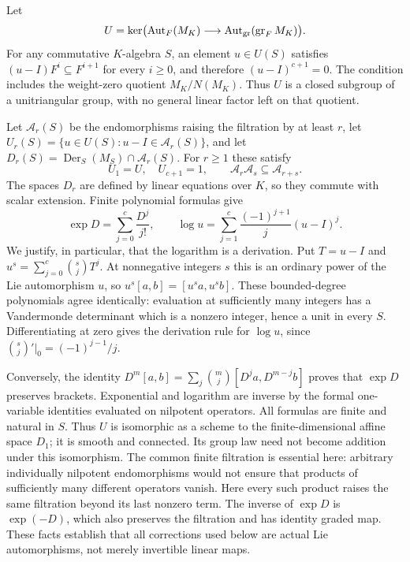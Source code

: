 Let
\[
 U=\ker\bigl(\operatorname{Aut}_F(M_K)
               \longrightarrow\operatorname{Aut}_{\operatorname{gr}}(\operatorname{gr}_FM_K)\bigr).
\]
For any commutative $K$-algebra $S$, an element $u\in U(S)$ satisfies
$(u-I)F^i\subseteq F^{i+1}$ for every $i\geq0$, and therefore
$(u-I)^{c+1}=0$. The condition includes the weight-zero quotient
$M_K/N(M_K)$. Thus $U$ is a closed subgroup of a
unitriangular group, with no general linear factor left on that quotient.

Let $\mathcal A_r(S)$ be the endomorphisms raising the filtration by at
least $r$, let $U_r(S)=\{u\in U(S):u-I\in\mathcal A_r(S)\}$, and let
$D_r(S)=\operatorname{Der}_S(M_S)\cap\mathcal A_r(S)$.
For $r\geq1$ these satisfy
\[
 U_1=U,\quad U_{c+1}=1,\qquad
 \mathcal A_r\mathcal A_s\subseteq\mathcal A_{r+s}.
\]
The spaces $D_r$ are defined by linear equations over $K$,
so they commute with scalar extension. Finite polynomial formulas give
\begin{equation}\label{eq:finite-exp-log}
 \exp D=\sum_{j=0}^c\frac{D^j}{j!},\qquad
 \log u=\sum_{j=1}^c\frac{(-1)^{j+1}}j(u-I)^j.
\end{equation}
We justify, in particular, that the logarithm is a derivation. Put
$T=u-I$ and $u^s=\sum_{j=0}^c\binom{s}{j}T^j$. At nonnegative integers
$s$ this is an ordinary power of the Lie automorphism $u$, so
$u^s[a,b]=[u^sa,u^sb]$. These bounded-degree polynomials agree
identically: evaluation at sufficiently many integers has a Vandermonde
determinant which is a nonzero integer, hence a unit in every $S$.
Differentiating at zero gives the derivation rule for $\log u$, since
$\binom{s}{j}'|_0=(-1)^{j-1}/j$.

Conversely, the identity
$D^m[a,b]=\sum_j\binom mj[D^ja,D^{m-j}b]$ proves that $\exp D$
preserves brackets. Exponential and logarithm are inverse by the formal
one-variable identities evaluated on nilpotent operators. All formulas
are finite and natural in $S$. Thus $U$ is isomorphic as a scheme to the
finite-dimensional affine space $D_1$; it is smooth and
connected. Its group law need not become addition under this isomorphism.
The common finite filtration is essential here: arbitrary individually
nilpotent endomorphisms would not ensure that products of sufficiently
many different operators vanish. Here every such product raises the same
filtration beyond its last nonzero term. The inverse of $\exp D$ is
$\exp(-D)$, which also preserves the filtration and has identity graded
map. These facts establish that all corrections used below are actual
Lie automorphisms, not merely invertible linear maps.

